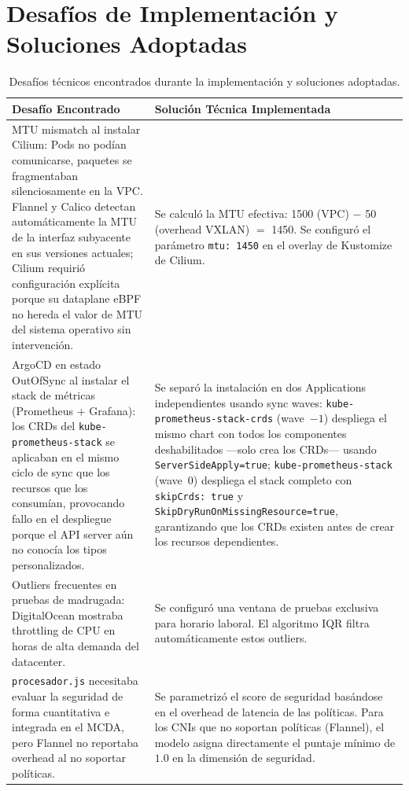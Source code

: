 \section{Desafíos de Implementación y Soluciones Adoptadas}

\begin{table}[htbp]
\centering
\scriptsize
\renewcommand{\arraystretch}{1.25}
\setlength{\tabcolsep}{4pt}
\caption{Desafíos técnicos encontrados durante la implementación y soluciones adoptadas.}
\label{tab:desafios-implementacion}
\begin{tabularx}{\textwidth}{|Y|Y|}
\hline
\textbf{Desafío Encontrado} & \textbf{Solución Técnica Implementada} \\
\hline
MTU mismatch al instalar Cilium: Pods no podían comunicarse, paquetes se fragmentaban silenciosamente en la VPC. Flannel y Calico detectan automáticamente la MTU de la interfaz subyacente en sus versiones actuales; Cilium requirió configuración explícita porque su dataplane eBPF no hereda el valor de MTU del sistema operativo sin intervención. & Se calculó la MTU efectiva: 1500 (VPC) $-$ 50 (overhead VXLAN) $=$ 1450. Se configuró el parámetro \texttt{mtu: 1450} en el overlay de Kustomize de Cilium. \\
\hline
ArgoCD en estado OutOfSync al instalar el stack de métricas (Prometheus + Grafana): los CRDs del \texttt{kube-prometheus-stack} se aplicaban en el mismo ciclo de sync que los recursos que los consumían, provocando fallo en el despliegue porque el API server aún no conocía los tipos personalizados. & Se separó la instalación en dos Applications independientes usando sync waves: \texttt{kube-prometheus-stack-crds} (wave~$-1$) despliega el mismo chart con todos los componentes deshabilitados ---solo crea los CRDs--- usando \texttt{ServerSideApply=true}; \texttt{kube-prometheus-stack} (wave~$0$) despliega el stack completo con \texttt{skipCrds:~true} y \texttt{SkipDryRunOnMissingResource=true}, garantizando que los CRDs existen antes de crear los recursos dependientes. \\
\hline
Outliers frecuentes en pruebas de madrugada: DigitalOcean mostraba throttling de CPU en horas de alta demanda del datacenter. & Se configuró una ventana de pruebas exclusiva para horario laboral. El algoritmo IQR filtra automáticamente estos outliers. \\
\hline
\texttt{procesador.js} necesitaba evaluar la seguridad de forma cuantitativa e integrada en el MCDA, pero Flannel no reportaba overhead al no soportar políticas. & Se parametrizó el score de seguridad basándose en el overhead de latencia de las políticas. Para los CNIs que no soportan políticas (Flannel), el modelo asigna directamente el puntaje mínimo de $1.0$ en la dimensión de seguridad. \\
\hline
\end{tabularx}
\end{table}

